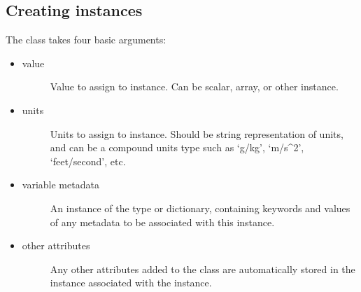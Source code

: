 \documentclass[a4paper,10pt,openany,english]{sphinxmanual}
\begin{document}
\subsection{Creating  instances}
\label{tutorial:creating-egadsdata-instances}
The {\hyperref[egadsapi:egads.core.egads_core.EgadsData]{}} class takes four basic arguments:
\begin{itemize}
\item {} \begin{description}
\item[{value}] \leavevmode
Value to assign to {\hyperref[egadsapi:egads.core.egads_core.EgadsData]{}} instance. Can be scalar, array, or other {\hyperref[egadsapi:egads.core.egads_core.EgadsData]{}} instance.

\end{description}

\item {} \begin{description}
\item[{units}] \leavevmode
Units to assign to {\hyperref[egadsapi:egads.core.egads_core.EgadsData]{}} instance. Should be string representation of units, and can be a compound units type such as `g/kg', `m/s\textasciicircum{}2', `feet/second', etc.

\end{description}

\item {} \begin{description}
\item[{variable metadata}] \leavevmode
An instance of the {\hyperref[egadsapi:egads.core.metadata.VariableMetadata]{}} type or dictionary, containing keywords and  values of any metadata to be associated with this {\hyperref[egadsapi:egads.core.egads_core.EgadsData]{}} instance.

\end{description}

\item {} \begin{description}
\item[{other attributes}] \leavevmode
Any other attributes added to the class are automatically stored in the {\hyperref[egadsapi:egads.core.metadata.VariableMetadata]{}} instance associated with the {\hyperref[egadsapi:egads.core.egads_core.EgadsData]{}} instance.

\end{description}

\end{itemize}
\end{document}
